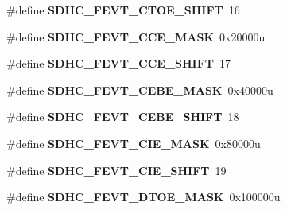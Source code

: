 \begin{DoxyCompactItemize}
\item 
\#define {\bfseries S\+D\+H\+C\+\_\+\+F\+E\+V\+T\+\_\+\+C\+T\+O\+E\+\_\+\+S\+H\+I\+FT}~16\hypertarget{group__SDHC__Register__Masks_ga3e2cf2283cca7b5b5e6c61c92df6bcd6}{}\label{group__SDHC__Register__Masks_ga3e2cf2283cca7b5b5e6c61c92df6bcd6}

\item 
\#define {\bfseries S\+D\+H\+C\+\_\+\+F\+E\+V\+T\+\_\+\+C\+C\+E\+\_\+\+M\+A\+SK}~0x20000u\hypertarget{group__SDHC__Register__Masks_ga78a1d9a0fbc16e86deafa9caad24f19c}{}\label{group__SDHC__Register__Masks_ga78a1d9a0fbc16e86deafa9caad24f19c}

\item 
\#define {\bfseries S\+D\+H\+C\+\_\+\+F\+E\+V\+T\+\_\+\+C\+C\+E\+\_\+\+S\+H\+I\+FT}~17\hypertarget{group__SDHC__Register__Masks_ga9776fd49381a062a66adc38bec98d758}{}\label{group__SDHC__Register__Masks_ga9776fd49381a062a66adc38bec98d758}

\item 
\#define {\bfseries S\+D\+H\+C\+\_\+\+F\+E\+V\+T\+\_\+\+C\+E\+B\+E\+\_\+\+M\+A\+SK}~0x40000u\hypertarget{group__SDHC__Register__Masks_ga0d8b77f77f69ea2af8a8a6fe5162c0af}{}\label{group__SDHC__Register__Masks_ga0d8b77f77f69ea2af8a8a6fe5162c0af}

\item 
\#define {\bfseries S\+D\+H\+C\+\_\+\+F\+E\+V\+T\+\_\+\+C\+E\+B\+E\+\_\+\+S\+H\+I\+FT}~18\hypertarget{group__SDHC__Register__Masks_gaf981263c00f8808cfcde0ff564529bcc}{}\label{group__SDHC__Register__Masks_gaf981263c00f8808cfcde0ff564529bcc}

\item 
\#define {\bfseries S\+D\+H\+C\+\_\+\+F\+E\+V\+T\+\_\+\+C\+I\+E\+\_\+\+M\+A\+SK}~0x80000u\hypertarget{group__SDHC__Register__Masks_ga3c29789497e34050f12d49b5f8424531}{}\label{group__SDHC__Register__Masks_ga3c29789497e34050f12d49b5f8424531}

\item 
\#define {\bfseries S\+D\+H\+C\+\_\+\+F\+E\+V\+T\+\_\+\+C\+I\+E\+\_\+\+S\+H\+I\+FT}~19\hypertarget{group__SDHC__Register__Masks_ga86ac6629356f3a89fbd8c06167abfac9}{}\label{group__SDHC__Register__Masks_ga86ac6629356f3a89fbd8c06167abfac9}

\item 
\#define {\bfseries S\+D\+H\+C\+\_\+\+F\+E\+V\+T\+\_\+\+D\+T\+O\+E\+\_\+\+M\+A\+SK}~0x100000u\hypertarget{group__SDHC__Register__Masks_ga6c5de59c47a6627c08013e5e5af04943}{}\label{group__SDHC__Register__Masks_ga6c5de59c47a6627c08013e5e5af04943}


\end{DoxyCompactItemize}
